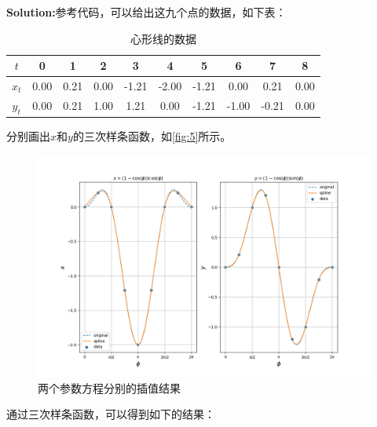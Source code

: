 \documentclass[12pt, a4paper, oneside]{article}
\begin{document}
\textbf{Solution:}参考代码，可以给出这九个点的数据，如下表：
\begin{table}[H]
    \centering
    \caption{心形线的数据}
    \label{tab:2}
    \begin{tabular}{|c|c|c|c|c|c|c|c|c|c|}
        \hline
        $t$ & 0 & 1 & 2 & 3 & 4 & 5 & 6 & 7 & 8\\
        \hline
        $x_t$ & 0.00 & 0.21 & 0.00 & -1.21 & -2.00 & -1.21 & 0.00 & 0.21 & 0.00 \\
        \hline
        $y_t$ & 0.00 & 0.21 & 1.00 & 1.21 & 0.00 & -1.21 & -1.00 & -0.21 & 0.00 \\
        \hline
    \end{tabular}
\end{table}
分别画出$x$和$y$的三次样条函数，如\autoref{fig:5}所示。
\begin{figure}[H]
    \centering
    \includegraphics[width=1.0\textwidth]{fig6.png}
    \caption{两个参数方程分别的插值结果}
    \label{fig:5}
\end{figure}
通过三次样条函数，可以得到如下的结果：
\end{document}
